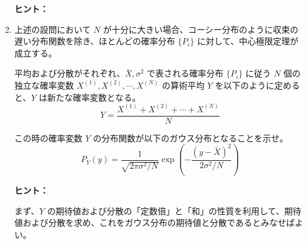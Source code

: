 \documentclass[uplatex,dvipdfmx,a4paper,11pt]{jsarticle}
\begin{document}
\begin{enumerate}
\begin{itembox}[l]{{\bf ヒント：}}
\end{itembox}

\item

上述の設問において $N$ が十分に大きい場合、コーシー分布のように収束の遅い分布関数を除き、ほとんどの確率分布 $\{ P_i \}$ に対して、中心極限定理が成立する。





平均および分散がそれぞれ、$\bar{X}, \sigma^2$ で表される確率分布 $\{ P_i \}$ に従う $N$ 個の独立な確率変数 $X^{(1)}, X^{(2)}, \cdots, X^{(N)}$ の算術平均 $Y$ を以下のように定めると、$Y$ は新たな確率変数となる。
\begin{equation*}
Y= \dfrac{X^{(1)} + X^{(2)} + \cdots + X^{(N)} }{N}
\end{equation*}

この時の確率変数 $Y$ の分布関数が以下のガウス分布となることを示せ。
\begin{equation*}
P_Y(y) = \dfrac{1}{\sqrt{2 \pi \sigma^2/N}} \exp \left(-\dfrac{(y-\bar{X})^2}{2 \sigma^2/N} \right)
\end{equation*}

\begin{itembox}[l]{{\bf ヒント：}}

まず、$Y$ の期待値および分散の「定数倍」と「和」の性質を利用して、期待値および分散を求め、これをガウス分布の期待値と分散であるとみなせばよい。

\end{itembox}


\end{enumerate}

\newpage
\end{document}
